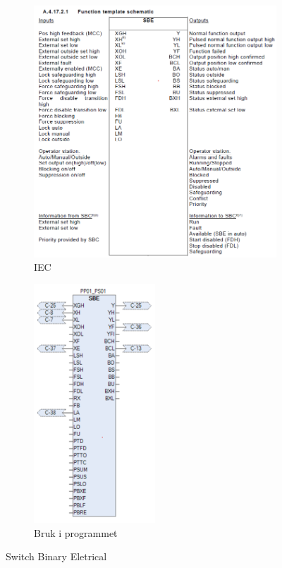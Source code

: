 \begin{figure}[htbp]
    \centering
    \begin{subfigure}[b]{0.45\textwidth}
        \centering
        \includegraphics[width=1\textwidth]{Bilder/SBEBlokkIEC.png}
        \caption{IEC}\label{fig:Switch Binary Eletrical blokk IEC}
    \end{subfigure}
    \hfill
    \begin{subfigure}[b]{0.45\textwidth}
        \centering
        \includegraphics[width=0.5\textwidth]{Bilder/SBEBlokkIProgrammet.png}
        \caption{Bruk i programmet}\label{fig:Switch Binary Eletrical blokk i programmet}
    \end{subfigure}
    \caption{Switch Binary Eletrical}\label{fig:Switch Binary Eletrical}
\end{figure}

